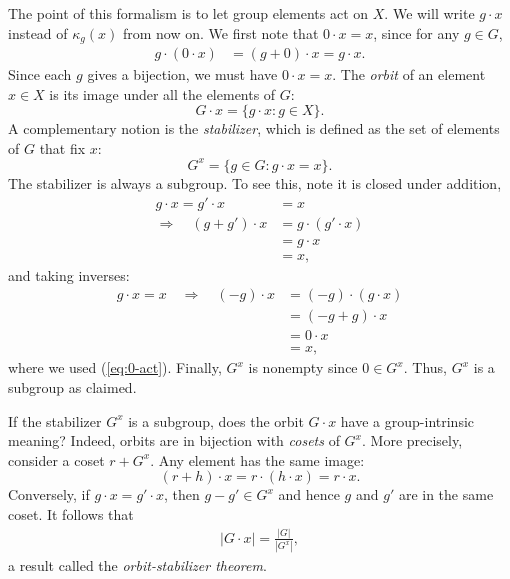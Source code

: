 \documentclass[aps, pre,reprint,nofootinbib,citeautoscript,floatfix]{revtex4-1}
\begin{document}
The point of this formalism is to let group elements act on $X$. We
will write $g \cdot x$ instead of $\kappa_g(x)$ from now on.
We first note that $0 \cdot x = x$, since for any $g \in G$,
\begin{align}
  g \cdot (0 \cdot x) & = (g + 0) \cdot x = g \cdot x.\label{eq:0-act}
\end{align}
Since each $g$ gives a bijection, we must have $0 \cdot x =x$.
The \emph{orbit} of an element $x\in X$ is its image under all the
elements of $G$:
\begin{equation}
  \label{eq:118}
  G \cdot x  = \{g \cdot x : g\in X\}.
\end{equation}
A complementary notion is the \emph{stabilizer}, which is defined as
the set of elements of $G$ that fix $x$:
\begin{equation}
  \label{eq:121}
  G^x = \{g \in G: g \cdot x = x\}.
\end{equation}
The stabilizer is always a subgroup. To see this, note it is closed under addition,
\begin{align*}
  g \cdot x = g' \cdot x & = x \quad \\
 \Longrightarrow \quad (g +
  g') \cdot x & = g \cdot (g' \cdot x) \\ & = g \cdot x \\ & = x,
\end{align*}
and taking inverses:
\begin{align*}
  g \cdot x = x \quad
 \Longrightarrow \quad (-g) \cdot x & = (-g) \cdot (g \cdot x) \\ & =
                                                                    (-g+
                                                                    g)\cdot
                                                                    x
  \\
  & = 0 \cdot x\\ & = x,
\end{align*}
where we used (\ref{eq:0-act}).
Finally, $G^x$ is nonempty since $0 \in G^x$. Thus, $G^x$ is a
subgroup as claimed.

If the stabilizer $G^x$ is a subgroup, does the orbit $G \cdot x$
have a group-intrinsic meaning? Indeed, orbits are in bijection with
\emph{cosets} of $G^x$.
More precisely, consider a coset $r + G^x$. Any element has the same image:
\[
  (r + h) \cdot x = r \cdot (h \cdot x) = r \cdot x.
\]
Conversely, if $g \cdot x = g' \cdot x$, then $g - g' \in G^x$ and
hence $g$ and $g'$ are in the same coset.
It follows that
\begin{align}
  |G\cdot x| = \frac{|G|}{|G^x|},
\end{align}
a result called the \emph{orbit-stabilizer theorem}.
\end{document}
